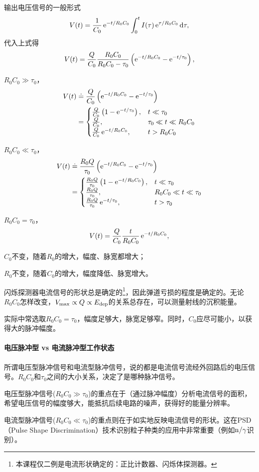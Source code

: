 输出电压信号的一般形式
\[
	V(t)=\frac1{C_0}\mathop{}\!\mathrm{e}^{-t/R_0C_0}\int_0^tI(\tau)\mathop{}\!\mathrm{e}^{\tau/R_0C_0}\mathop{}\!\mathrm{d}\tau,
\]
代入上式得
\[
	V(t)=\frac Q{C_0}\frac{R_0C_0}{R_0C_0-\tau_0}\left(\mathop{}\!\mathrm{e}^{-t/R_0C_0}-\mathop{}\!\mathrm{e}^{-t/\tau_0}\right),
\]
\begin{compactitem}
	\item $R_0C_0\gg\tau_0$，
	\begin{align*}
		V(t)&\doteq\frac Q{C_0}\left(\mathop{}\!\mathrm{e}^{-t/R_0C_0}-\mathop{}\!\mathrm{e}^{-t/\tau_0}\right)\\
		&=\begin{cases}
			\frac Q{C_0}\left(1-\mathop{}\!\mathrm{e}^{-t/\tau_0}\right),&t\ll\tau_0\\
			\frac Q{C_0},&\tau_0\ll t\ll R_0C_0\\
			\frac Q{C_0}\mathop{}\!\mathrm{e}^{-t/R_0C_0},&t>R_0C_0
		\end{cases}
	\end{align*}
	\item $R_0C_0\ll\tau_0$，
	\begin{align*}
		V(t)&\doteq\frac{R_0Q}{\tau_0}\left(\mathop{}\!\mathrm{e}^{-t/R_0C_0}-\mathop{}\!\mathrm{e}^{-t/\tau_0}\right)\\
		&=\begin{cases}
			\frac{R_0Q}{\tau_0}\left(1-\mathop{}\!\mathrm{e}^{-t/R_0C_0}\right),&t\ll\tau_0\\
			\frac {R_0Q}{\tau_0},&R_0C_0\ll t\ll \tau_0\\
			\frac {R_0Q}{\tau_0}\mathop{}\!\mathrm{e}^{-t/\tau_0},&t>\tau_0
		\end{cases}
	\end{align*}
	\item $R_0C_0=\tau_0$，
	\[
		V(t)=\frac{Q}{C_0}\frac{t}{R_0C_0}\mathop{}\!\mathrm{e}^{-t/R_0C_0},
	\]
	
	\item $C_0$不变，随着$R_0$的增大，幅度、脉宽都增大；
	\item $R_0$不变，随着$C_0$的增大，幅度降低、脉宽增大。
\end{compactitem}

闪烁探测器电流信号的形状总是确定的\footnote{本课程仅二例是电流形状确定的：正比计数器、闪烁体探测器。}，因此弹道亏损的程度是确定的。无论$R_0C_0$怎样改变，$V_\mathrm{max}\propto Q\propto E_{\mathrm{dep}}$的关系总存在，可以测量射线的沉积能量。

实际中常选取$R_0C_0=\tau_0$，幅度足够大，脉宽足够窄。同时，$C_0$应尽可能小，以获得大的脉冲幅度。
\paragraph{电压脉冲型 vs 电流脉冲型工作状态}
所谓电压型脉冲信号和电流型脉冲信号，说的都是电流信号流经外回路后的电压信号。$R_0C_0$和$\tau_0$之间的大小关系，决定了是哪种脉冲信号。
\begin{compactitem}
	\item 电压型脉冲信号($R_0C_0\gg\tau_0$)的重点在于（通过脉冲幅度）分析电流信号的面积，希望电压信号的幅度够大，能抵抗后续电路的噪声，获得好的能量分辨率。
	\item 电流型脉冲信号($R_0C_0\ll\tau_0$)的重点则在于如实地反映电流信号的形状。这在PSD （Pulse Shape Discrimination）技术识别粒子种类的应用中非常重要（例如$\mathrm n/\gamma$识别）。
\end{compactitem}

